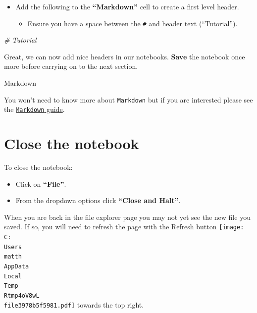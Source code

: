 \documentclass[
]{book}
\newenvironment{Shaded}{\begin{snugshade}}{\end{snugshade}}
\newcommand{\CommentTok}[1]{\textcolor[rgb]{0.56,0.35,0.01}{\textit{#1}}}
\providecommand{\tightlist}{%
  \setlength{\itemsep}{0pt}\setlength{\parskip}{0pt}}
\begin{document}
\begin{itemize}
\tightlist
\item
  Add the following to the \textbf{``Markdown''} cell to create a first level header.

  \begin{itemize}
  \tightlist
  \item
    Ensure you have a space between the \texttt{\#} and header text (``Tutorial'').
  \end{itemize}
\end{itemize}

\begin{Shaded}
\begin{Highlighting}[]
\CommentTok{\# Tutorial}
\end{Highlighting}
\end{Shaded}

Great, we can now add nice headers in our notebooks. \textbf{Save} the notebook once more before carrying on to the next section.

Markdown

You won't need to know more about \texttt{Markdown} but if you are interested please see the \href{https://www.markdownguide.org/basic-syntax/}{\texttt{Markdown} guide}.

\hypertarget{close-the-notebook}{%
\section{Close the notebook}\label{close-the-notebook}}

To close the notebook:

\begin{itemize}
\tightlist
\item
  Click on \textbf{``File''}.
\item
  From the dropdown options click \textbf{``Close and Halt''}.
\end{itemize}

When you are back in the file explorer page you may not yet see the new file you saved. If so, you will need to refresh the page with the Refresh button
\protect\texttt{[image: C:\\Users\\matth\\AppData\\Local\\Temp\\Rtmp4oV8wL\\file3978b5f5981.pdf]}
towards the top right.
\end{document}
